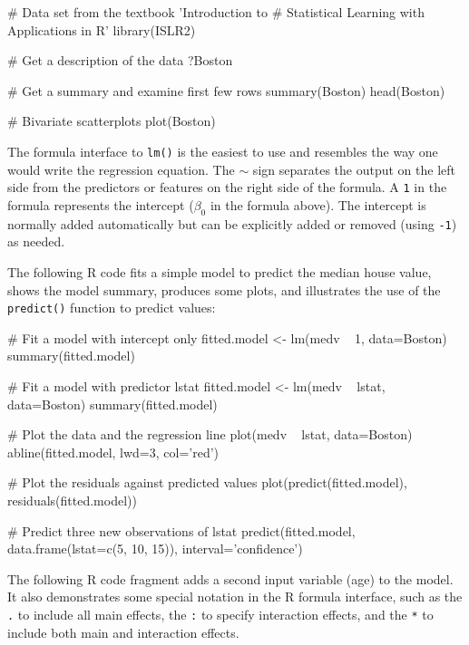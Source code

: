\begin{samepage}
\begin{Rcode}
# Data set from the textbook 'Introduction to 
# Statistical Learning with Applications in R'
library(ISLR2)

# Get a description of the data
?Boston

# Get a summary and examine first few rows
summary(Boston)
head(Boston)

# Bivariate scatterplots
plot(Boston)
\end{Rcode}
\end{samepage}

The formula interface to \texttt{lm()} is the easiest to use and resembles the way one would write the regression equation. The $\sim$ sign separates the output on the left side from the predictors or features on the right side of the formula. A \texttt{1} in the formula represents the intercept ($\beta_0$ in the formula above). The intercept is normally added automatically but can be explicitly added or removed (using \texttt{-1}) as needed. 

The following R code fits a simple model to predict the median house value, shows the model summary, produces some plots, and illustrates the use of the \texttt{predict()} function to predict values:

\begin{samepage}
\begin{Rcode}
# Fit a model with intercept only
fitted.model <- lm(medv ~ 1, data=Boston)
summary(fitted.model)

# Fit a model with predictor lstat
fitted.model <- lm(medv ~ lstat, data=Boston)
summary(fitted.model)

# Plot the data and the regression line
plot(medv ~ lstat, data=Boston)
abline(fitted.model, lwd=3, col='red')

# Plot the residuals against predicted values
plot(predict(fitted.model), residuals(fitted.model))

# Predict three new observations of lstat
predict(fitted.model, data.frame(lstat=c(5, 10, 15)), 
   interval='confidence')
\end{Rcode}
\end{samepage}

The following R code fragment adds a second input variable (age) to the model. It also demonstrates some special notation in the R formula interface, such as the \texttt{.} to include all main effects, the \texttt{:} to specify interaction effects, and the \texttt{*} to include both main and interaction effects.


